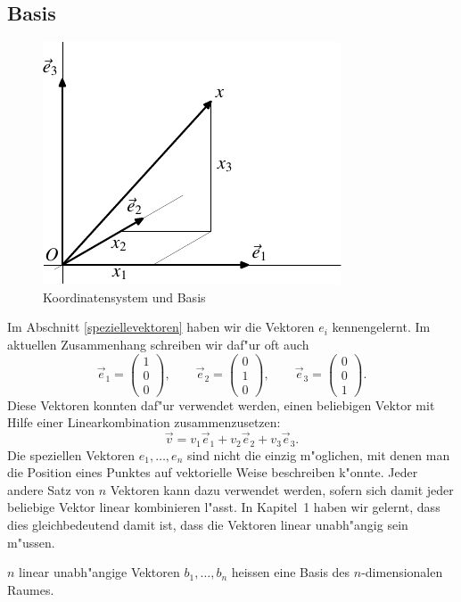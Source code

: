 \subsection{Basis}
\begin{figure}
\begin{center}
\includegraphics{images/v-5}
\end{center}
\caption{Koordinatensystem und Basis\label{imagebasis}}
\end{figure}
Im Abschnitt \ref{speziellevektoren} haben wir die Vektoren $e_i$
kennengelernt.
Im aktuellen Zusammenhang schreiben wir daf"ur oft auch
\[
\vec e_1=\begin{pmatrix}1\\0\\0\end{pmatrix},\qquad
\vec e_2=\begin{pmatrix}0\\1\\0\end{pmatrix},\qquad
\vec e_3=\begin{pmatrix}0\\0\\1\end{pmatrix}.
\]
Diese Vektoren konnten daf"ur verwendet werden, einen beliebigen Vektor
mit Hilfe einer Linearkombination zusammenzusetzen:
\[
\vec v=
v_1\vec e_1+
v_2\vec e_2+
v_3\vec e_3.
\]
Die speziellen Vektoren $e_1,\dots,e_n$ sind nicht die einzig m"oglichen,
mit denen man die Position eines Punktes auf vektorielle Weise
beschreiben k"onnte.
Jeder andere Satz von $n$ Vektoren kann
dazu verwendet werden, sofern sich damit jeder beliebige Vektor
linear kombinieren l"asst.
In Kapitel~1 haben wir gelernt, dass dies
gleichbedeutend damit ist, dass die Vektoren linear unabh"angig sein
m"ussen.
\begin{definition}
$n$ linear unabh"angige Vektoren $b_1,\dots,b_n$ heissen eine
Basis des $n$-dimensionalen Raumes.
\end{definition}
